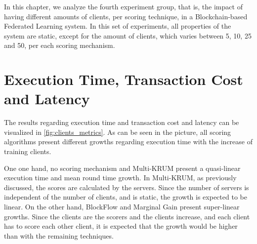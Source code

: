 In this chapter, we analyze the fourth experiment group, that is, the impact of having different amounts of clients, per scoring technique, in a Blockchain-based Federated Learning system. In this set of experiments, all properties of the system are static, except for the amount of clients, which varies between 5, 10, 25 and 50, per each scoring mechanism.

\todo{}

\section{Execution Time, Transaction Cost and Latency}

The results regarding execution time and transaction cost and latency can be visualized in \autoref{fig:clients_metrics}. As can be seen in the picture, all scoring algorithms present different growths regarding execution time with the increase of training clients.

One one hand, no scoring mechanism and Multi-KRUM present a quasi-linear execution time and mean round time growth. In Multi-KRUM, as previously discussed, the scores are calculated by the servers. Since the number of servers is independent of the number of clients, and is static, the growth is expected to be linear. On the other hand, BlockFlow and Marginal Gain present super-linear growths. Since the clients are the scorers and the clients increase, and each client has to score each other client, it is expected that the growth would be higher than with the remaining techniques.


